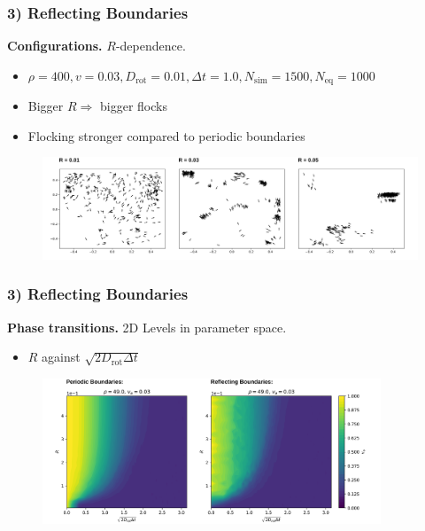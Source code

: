 \begin{frame}
	\frametitle{3) Reflecting Boundaries}
	\textbf{Configurations.} $R$-dependence.
	\begin{itemize}
	    \item $\rho = 400, v = 0.03, D_{\text{rot}} = 0.01, \Delta t = 1.0, N_{\text{sim}} = 1500, N_{\text{eq}} = 1000$
	    \item Bigger $R\Rightarrow$ bigger flocks 
	    \item Flocking stronger compared to periodic boundaries
	\end{itemize}
	\begin{figure}[H]
  		\includegraphics[width=\textwidth]{images/chapter3/N_20_L_1.000000_v_0.030000_R_D_0.010000_rbc.png} 
	\end{figure}
\end{frame}

\begin{frame}
	\frametitle{3) Reflecting Boundaries}
	\textbf{Phase transitions.} 2D Levels in parameter space.
	\begin{itemize}
	    \item $R$ against $\sqrt{2D_{\text{rot}}\Delta t}$
	\end{itemize}
	\begin{figure}[H]
  		\includegraphics[width=0.9\textwidth]{images/chapter3/r_eta_transition_2D_comparison_pbc_rbc.png} 
	\end{figure}
\end{frame}

